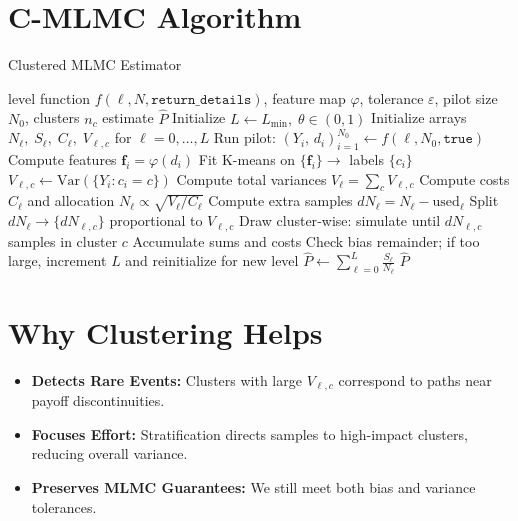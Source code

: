 \documentclass{article}
\begin{document}
\section{C-MLMC Algorithm}
\begin{algorithm}[H]
\caption{Clustered MLMC Estimator}
\label{alg:cmlmc}
\begin{algorithmic}[1]
\REQUIRE level function \(f(\ell,N,\texttt{return\_details})\), feature map \(\varphi\), tolerance \(\varepsilon\), pilot size \(N_0\), clusters \(n_c\)
\ENSURE estimate \(\hat{P}\)
\vspace{1ex}
\STATE Initialize \(L \leftarrow L_{\min},\;\theta\in(0,1)\)
\STATE Initialize arrays \(N_\ell,\;S_\ell,\;C_\ell,\;V_{\ell,c}\) for \(\ell=0,\dots,L\)
      \STATE Run pilot: \((Y_i,\,d_i)_{i=1}^{N_0}\gets f(\ell,N_0,\texttt{true})\)
      \STATE Compute features \(\mathbf{f}_i=\varphi(d_i)\)
      \STATE Fit K-means on \(\{\mathbf{f}_i\}\to\) labels \(\{c_i\}\)
        \STATE \(V_{\ell,c}\leftarrow\mathrm{Var}(\{Y_i: c_i=c\})\)
      \ENDFOR
    \ENDIF
  \ENDFOR
  \STATE Compute total variances \(V_\ell=\sum_{c}V_{\ell,c}\)
  \STATE Compute costs \(C_\ell\) and allocation \(N_\ell\propto\sqrt{V_\ell/C_\ell}\)
  \STATE Compute extra samples \(dN_\ell=N_\ell - \text{used}_\ell\)
      \STATE Split \(dN_\ell\to\{dN_{\ell,c}\}\) proportional to \(V_{\ell,c}\)
        \STATE Draw cluster‐wise: simulate until \(dN_{\ell,c}\) samples in cluster \(c\)
        \STATE Accumulate sums and costs
      \ENDFOR
    \ENDIF
  \ENDFOR
  \STATE Check bias remainder; if too large, increment \(L\) and reinitialize for new level
\ENDWHILE
\STATE \(\hat{P} \leftarrow \sum_{\ell=0}^L \frac{S_\ell}{N_\ell}\)
\RETURN \(\hat{P}\)
\end{algorithmic}
\end{algorithm}

\section{Why Clustering Helps}
\begin{itemize}
  \item \textbf{Detects Rare Events:} Clusters with large \(V_{\ell,c}\) correspond to paths near payoff discontinuities.
  \item \textbf{Focuses Effort:} Stratification directs samples to high-impact clusters, reducing overall variance.
  \item \textbf{Preserves MLMC Guarantees:} We still meet both bias and variance tolerances.
\end{itemize}
\end{document}
